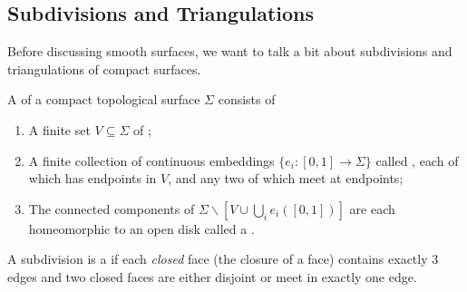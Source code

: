 \documentclass[a4paper]{scrartcl}
\begin{document}
\subsection{Subdivisions and Triangulations}

Before discussing smooth surfaces, we want to talk a bit about subdivisions and triangulations of compact surfaces.

\begin{definition}[Subdivision]
    A  of a compact topological surface $\Sigma$ consists of 
    \begin{enumerate}[label=(\roman*)]
        \item A finite set $V \subseteq \Sigma$ of ;
        \item A finite collection of continuous embeddings $\{e_i : [0, 1] \rightarrow \Sigma\}$ called , each of which has endpoints in $V$, and any two of which meet at endpoints;
        \item The connected components of $\Sigma \backslash \left[V \cup \bigcup_i e_i([0, 1])\right]$ are each homeomorphic to an open disk called a .
    \end{enumerate}
\end{definition}

\begin{definition}[Triangulation]
    A subdivision is a  if each \emph{closed} face (the closure of a face) contains exactly 3 edges and two closed faces are either disjoint or meet in exactly one edge.    
\end{definition}
\end{document}
